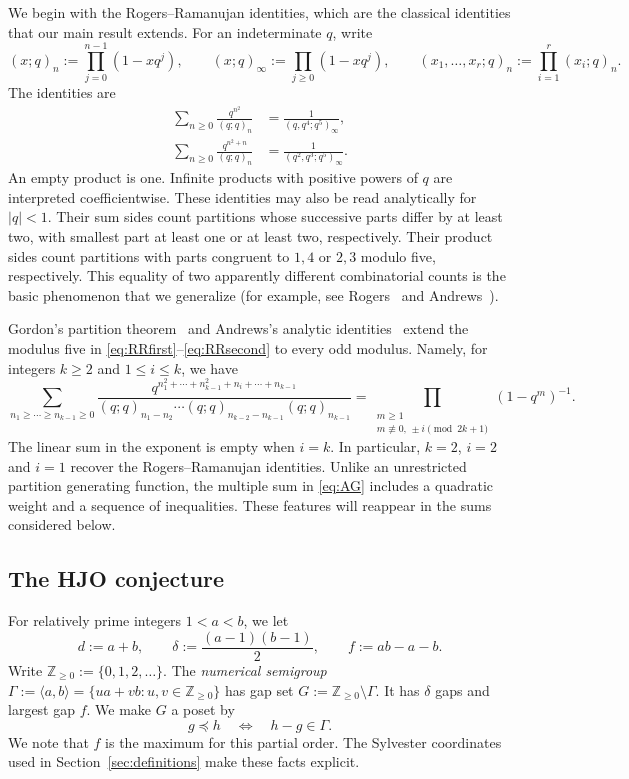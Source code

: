 \documentclass[12pt,reqno]{amsart}
\numberwithin{equation}{section}
\theoremstyle{definition}
\theoremstyle{remark}
\theoremstyle{plain}
\newcommand{\NN}{\mathbb Z_{\ge0}}
\begin{document}
We begin with the Rogers--Ramanujan identities, which are the classical identities that our main result extends.
For an indeterminate $q$, write
\[
 (x;q)_n:=\prod_{j=0}^{n-1}(1-xq^j),\qquad
 (x;q)_\infty:=\prod_{j\ge0}(1-xq^j),\qquad
 (x_1,\ldots,x_r;q)_n:=\prod_{i=1}^r(x_i;q)_n.
\]
The identities are
\begin{align}
 \sum_{n\ge0}\frac{q^{n^2}}{(q;q)_n}
 &=\frac1{(q,q^4;q^5)_\infty},\label{eq:RRfirst}\\
 \sum_{n\ge0}\frac{q^{n^2+n}}{(q;q)_n}
 &=\frac1{(q^2,q^3;q^5)_\infty}.\label{eq:RRsecond}
\end{align}
An empty product is one. Infinite products with positive powers of $q$ are interpreted coefficientwise. These identities may also be read analytically for $|q|<1$. Their sum sides count partitions whose successive parts differ by at least two, with smallest part at least one or at least two, respectively. Their product sides count partitions with parts congruent to $1,4$ or $2,3$ modulo five, respectively. This equality of two apparently different combinatorial counts is the basic phenomenon that we generalize (for example, see Rogers~\cite{Rogers} and Andrews~\cite[Chapter~7]{AndrewsBook}).

Gordon's partition theorem~\cite{Gordon} and Andrews's analytic identities~\cite[pp.~4082--4083]{Andrews} extend the modulus five in \eqref{eq:RRfirst}--\eqref{eq:RRsecond} to every odd modulus. Namely, for integers $k\ge2$ and $1\le i\le k$, we have
\begin{equation}\label{eq:AG}
 \sum_{n_1\ge\cdots\ge n_{k-1}\ge0}
 \frac{q^{n_1^2+\cdots+n_{k-1}^2+n_i+\cdots+n_{k-1}}}
 {(q;q)_{n_1-n_2}\cdots(q;q)_{n_{k-2}-n_{k-1}}(q;q)_{n_{k-1}}}
 =\prod_{\substack{m\ge1\\m\not\equiv0,\,\pm i\pmod{2k+1}}}
 (1-q^m)^{-1}.
\end{equation}
The linear sum in the exponent is empty when $i=k$. In particular, $k=2$, $i=2$ and $i=1$ recover the Rogers--Ramanujan identities.
Unlike an unrestricted partition generating function, the multiple sum in \eqref{eq:AG} includes a quadratic weight and a sequence of inequalities. These features will reappear in the sums considered below.

\subsection{The HJO conjecture}
For relatively prime integers $1<a<b$, we
let
\begin{equation}\label{eq:parameters}
 d:=a+b,\qquad \delta:=\frac{(a-1)(b-1)}2,\qquad f:=ab-a-b.
\end{equation}
Write $\NN:=\{0,1,2,\ldots\}$. The {\it numerical semigroup}
\(
 \Gamma:=\langle a,b\rangle=\{ua+vb:u,v\in\NN\}
\)
has gap set $G:=\NN\setminus\Gamma$. It has $\delta$ gaps and largest gap $f$. We make $G$ a poset by
\[
 g\preceq h\quad\Longleftrightarrow\quad h-g\in\Gamma.
\]
We note that $f$ is the maximum for this partial order. The Sylvester coordinates used in Section~\ref{sec:definitions} make these facts explicit.
\end{document}
